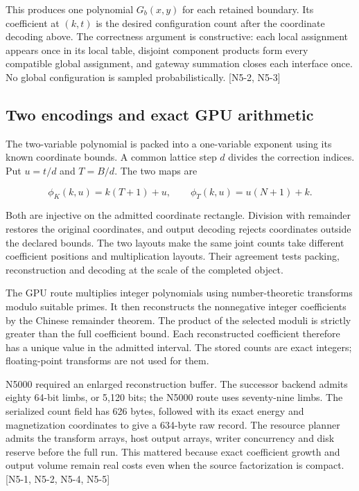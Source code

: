 This produces one polynomial \(G_b(x,y)\) for each retained boundary. Its coefficient at \((k,t)\) is the desired configuration count after the coordinate decoding above. The correctness argument is constructive: each local assignment appears once in its local table, disjoint component products form every compatible global assignment, and gateway summation closes each interface once. No global configuration is sampled probabilistically. {[}N5-2, N5-3{]}

\subsection{Two encodings and exact GPU arithmetic}\label{two-encodings-and-exact-gpu-arithmetic}

The two-variable polynomial is packed into a one-variable exponent using its known coordinate bounds. A common lattice step \(d\) divides the correction indices. Put \(u=t/d\) and \(T=B/d\). The two maps are

\[\phi_K(k,u)=k(T+1)+u,\qquad \phi_T(k,u)=u(N+1)+k.\]

Both are injective on the admitted coordinate rectangle. Division with remainder restores the original coordinates, and output decoding rejects coordinates outside the declared bounds. The two layouts make the same joint counts take different coefficient positions and multiplication layouts. Their agreement tests packing, reconstruction and decoding at the scale of the completed object.

The GPU route multiplies integer polynomials using number-theoretic transforms modulo suitable primes. It then reconstructs the nonnegative integer coefficients by the Chinese remainder theorem. The product of the selected moduli is strictly greater than the full coefficient bound. Each reconstructed coefficient therefore has a unique value in the admitted interval. The stored counts are exact integers; floating-point transforms are not used for them.

N5000 required an enlarged reconstruction buffer. The successor backend admits eighty 64-bit limbs, or 5,120 bits; the N5000 route uses seventy-nine limbs. The serialized count field has 626 bytes, followed with its exact energy and magnetization coordinates to give a 634-byte raw record. The resource planner admits the transform arrays, host output arrays, writer concurrency and disk reserve before the full run. This mattered because exact coefficient growth and output volume remain real costs even when the source factorization is compact. {[}N5-1, N5-2, N5-4, N5-5{]}

